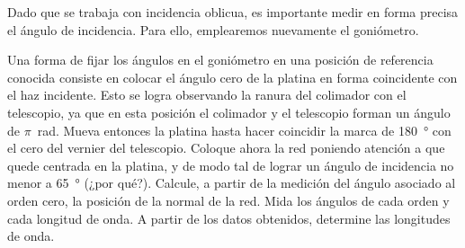 \documentclass[laboratorio]{guia}
\begin{document}
Dado que se trabaja con incidencia oblicua, es importante medir en forma precisa el ángulo de incidencia.
Para ello, emplearemos nuevamente el goniómetro. 

Una forma de fijar los ángulos en el goniómetro en una posición de referencia conocida consiste en colocar el ángulo cero de la platina en forma coincidente con el haz incidente.
Esto se logra observando la ranura del colimador con el telescopio, ya que en esta posición el colimador y el telescopio forman un ángulo de \(\pi\)~rad.
Mueva entonces la platina hasta hacer coincidir la marca de \SI{180}{\degree} con el cero del vernier del telescopio.
Coloque ahora la red poniendo atención a que quede centrada en la platina, y de modo tal de lograr un ángulo de incidencia no menor a \SI{65}{\degree} (¿por qué?).
Calcule, a partir de la medición del ángulo asociado al orden cero, la posición de la normal de la red.
Mida los ángulos de cada orden y cada longitud de onda.
A partir de los datos obtenidos, determine las longitudes de onda. 











\nocite{Alonso1998,Jenkins2001,Hecht1986}


\end{document}
